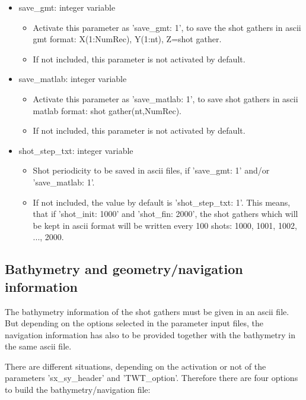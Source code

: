\documentclass[11pt, oneside]{article}   	%
\begin{document}
\begin{itemize}
  \item save\_gmt: integer variable 
	\begin{itemize}
	\item Activate this parameter as 'save\_gmt: 1', to save the shot gathers in ascii gmt format: X(1:NumRec), Y(1:nt), Z=shot gather.
	\item If not included, this parameter is not activated by default.
	\end{itemize}

  \item save\_matlab: integer variable 
	\begin{itemize}
	\item Activate this parameter as 'save\_matlab: 1', to save shot gathers in ascii matlab format: shot gather(nt,NumRec).
	\item If not included, this parameter is not activated by default.
	\end{itemize}

  \item shot\_step\_txt: integer variable 
  	\begin{itemize}
	\item Shot periodicity to be saved in ascii files, if 'save\_gmt: 1' and/or 'save\_matlab: 1'.
	\item If not included, the value by default is 'shot\_step\_txt: 1'. This means, that if 'shot\_init: 1000' and 'shot\_fin: 2000', the shot gathers which will be kept in ascii format will be written every 100 shots: 1000, 1001, 1002, ..., 2000.
	\end{itemize}

	
\end{itemize}

\subsection{Bathymetry and geometry/navigation information}\label{sec4b}
The bathymetry information of the shot gathers must be given in an ascii file. But depending on the options selected in the parameter input files, the navigation information has also to be provided together with the bathymetry in the same ascii file. 

There are different situations, depending on the activation or not of the parameters 'sx\_sy\_header' and 'TWT\_option'. Therefore there are four options to build the bathymetry/navigation file:
\end{document}
